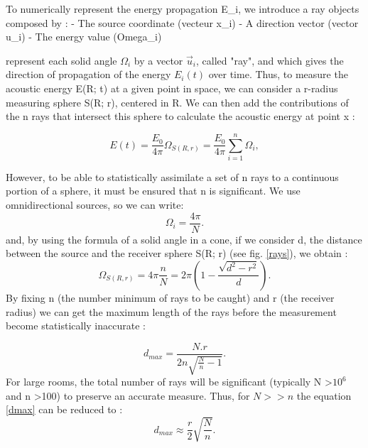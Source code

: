 \documentclass[AMA,STIX1COL]{WileyNJD-v2}
\begin{document}
To numerically represent the energy propagation E_i, we introduce a ray objects composed by :
- The source coordinate (vecteur x_i)
- A direction vector (vector u_i)
- The energy value (Omega_i)


represent each solid angle $ \Omega_i$ by a vector $\overrightarrow{u}_i$, called "ray", and which gives the direction of propagation of the energy $E_i(t)$ over time. Thus, to measure the acoustic energy E(R; t) at a given point in space, we can consider a r-radius measuring sphere S(R; r), centered in R. We can then add the contributions of the n rays that intersect this sphere to calculate the acoustic energy at point x :

\begin{equation}
E(t) = \frac{E_0}{4\pi}\Omega_{S(R,r)} = \frac{E_0}{4\pi}  \sum_{i=1}^n \Omega_i,
\end{equation}

However, to be able to statistically assimilate a set of n rays to a continuous portion of a sphere, it must be ensured that n is significant. We use omnidirectional sources, so we can write:
\begin{equation}
	\Omega_i = \frac{4\pi}{N}.
\end{equation}
%
and, by using the formula of a solid angle in a cone, if we consider d, the distance between the source and the receiver sphere S(R; r) (see fig. \ref{rays}), we obtain :
\begin{equation}
	\Omega_{S(R,r)} = 4\pi \frac{n}{N} = 2\pi \left(1- \frac{\sqrt{d^2-r^2}}{d}\right).
\end{equation}
%
By fixing n (the number minimum of rays to be caught) and r (the receiver radius) we can get the maximum length of the rays before the measurement become statistically inaccurate  \cite{cfa} :

\begin{equation} \label{dmax}
	d_{max} =  \frac{N.r}{2n\sqrt{\frac{N}{n}-1}}.
\end{equation}
%
For large rooms, the total number of rays will be significant (typically N >$10^6$ and n >100) to preserve an accurate measure. Thus, for $N>>n$ the equation \ref{dmax} can be reduced to :
\begin{equation}
	d_{max} \approx  \frac{r}{2}\sqrt{\frac{N}{n}}.
\end{equation}
\end{document}
